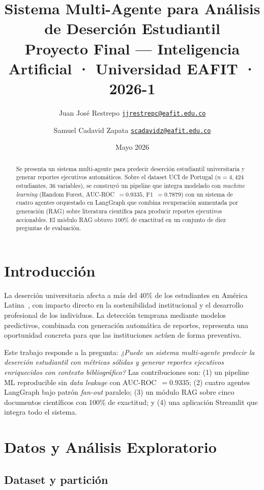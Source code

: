 \documentclass[11pt, a4paper]{article}
\title{\textbf{Sistema Multi-Agente para Análisis de Deserción Estudiantil}\\[4pt]
\large Proyecto Final — Inteligencia Artificial · Universidad EAFIT · 2026-1}
\author{
  Juan José Restrepo \quad \href{mailto:jjrestrepc@eafit.edu.co}{\texttt{jjrestrepc@eafit.edu.co}}
  \and
  Samuel Cadavid Zapata \quad \href{mailto:scadavidz@eafit.edu.co}{\texttt{scadavidz@eafit.edu.co}}
}
\date{Mayo 2026}
\begin{document}
\maketitle
\thispagestyle{fancy}

\begin{abstract}
\noindent
Se presenta un sistema multi-agente para predecir deserción estudiantil universitaria
y generar reportes ejecutivos automáticos. Sobre el dataset UCI de Portugal
($n{=}4{,}424$ estudiantes, 36 variables), se construyó un pipeline que integra
modelado con \textit{machine learning} (Random Forest, AUC-ROC~$=0.9335$,
F1~$=0.7879$) con un sistema de cuatro agentes orquestado en LangGraph
que combina recuperación aumentada por generación (RAG) sobre literatura
científica para producir reportes ejecutivos accionables. El módulo RAG
obtuvo 100\% de exactitud en un conjunto de diez preguntas de evaluación.
\end{abstract}

\section{Introducción}

La deserción universitaria afecta a más del 40\% de los estudiantes en
América Latina~\cite{tinto1987}, con impacto directo en la sostenibilidad
institucional y el desarrollo profesional de los individuos. La detección
temprana mediante modelos predictivos, combinada con generación automática
de reportes, representa una oportunidad concreta para que las instituciones
actúen de forma preventiva.

Este trabajo responde a la pregunta: \textit{¿Puede un sistema multi-agente
predecir la deserción estudiantil con métricas sólidas y generar reportes
ejecutivos enriquecidos con contexto bibliográfico?} Las contribuciones son:
(1) un pipeline ML reproducible sin \textit{data leakage} con AUC-ROC~$=0.9335$;
(2) cuatro agentes LangGraph bajo patrón \textit{fan-out} paralelo;
(3) un módulo RAG sobre cinco documentos científicos con 100\% de exactitud;
y (4) una aplicación Streamlit que integra todo el sistema.

\section{Datos y Análisis Exploratorio}

\subsection{Dataset y partición}
\end{document}
